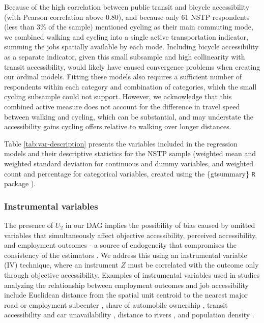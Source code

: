 \documentclass[preprint, 3p,
authoryear]{elsarticle} %
\begin{document}
Because of the high correlation between public transit and bicycle
accessibility (with Pearson correlation above 0.80), and because only 61
NSTP respondents (less than 3\% of the sample) mentioned cycling as
their main commuting mode, we combined walking and cycling into a single
active transportation indicator, summing the jobs spatially available by
each mode. Including bicycle accessibility as a separate indicator,
given this small subsample and high collinearity with transit
accessibility, would likely have caused convergence problems when
creating our ordinal models. Fitting these models also requires a
sufficient number of respondents within each category and combination of
categories, which the small cycling subsample could not support.
However, we acknowledge that this combined active measure does not
account for the difference in travel speed between walking and cycling,
which can be substantial, and may understate the accessibility gains
cycling offers relative to walking over longer distances.

Table \ref{tab:var-description} presents the variables included in the
regression models and their descriptive statistics for the NSTP sample
(weighted mean and weighted standard deviation for continuous and dummy
variables, and weighted count and percentage for categorical variables,
created using the \{gtsummary\} \texttt{R} package \citep{gtsummary}).

\subsubsection{Instrumental variables}\label{instrumental-variables}

The presence of \(U_2\) in our DAG implies the possibility of bias
caused by omitted variables that simultaneously affect objective
accessibility, perceived accessibility, and employment outcomes - a
source of endogeneity that compromises the consistency of the estimators
\citep{antonakis2010, cunningham2021causal, huntington-klein2021}. We
address this using an instrumental variable (IV) technique, where an
instrument \(Z\) must be correlated with the outcome only through
objective accessibility. Examples of instrumental variables used in
studies analyzing the relationship between employment outcomes and job
accessibility include Euclidean distance from the spatial unit centroid
to the nearest major road or employment subcenter
\citep{delmelle2021, jin2018}, share of automobile ownership
\citep{Hu2017}, transit accessibility and car unavailability
\citep{johnson2017}, distance to rivers \citep{duarte2023, luz2022}, and
population density \citep{bastiaanssen2021, bastiaanssen2025}.
\end{document}
